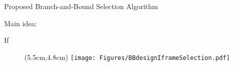 \begin{frame}{Proposed Branch-and-Bound Selection Algorithm}
\begin{itemize}
	\myItem Main idea:
	\begin{itemize}
		\mySubItem If 
	\end{itemize}
\end{itemize}
%
\begin{figure}
\centering
\begin{textblock*}{1cm}(5.5cm,4.8cm) %
\texttt{[image: Figures/BBdesignIframeSelection.pdf]}
\end{textblock*}
\end{figure}
%
\end{frame}